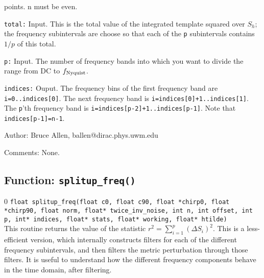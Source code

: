 \begin{description}
  points.  n must be even.
\item{\tt total:} Input.  This is the total value of the integrated
  template squared over $S_h$; the frequency
  subintervals are choose so that each of the {\tt p} subintervals
  contains $1/p$ of this total.
\item{\tt p:} Input.  The number of frequency bands into which you want to divide the range
  from DC to $f_{\rm Nyquist}$.
\item{\tt indices:} Ouput.  The frequency bins of the first frequency band are
  {\tt i=0..indices[0]}.  The next frequency band is  {\tt i=indices[0]+1..indices[1]}.
  The {\tt p}'th frequency band is {\tt i=indices[p-2]+1..indices[p-1]}.
  Note that {\tt indices[p-1]=n-1}.
\end{description}
\begin{description}
\item{Author:}
Bruce Allen, ballen@dirac.phys.uwm.edu
\item{Comments:}
None.
\end{description}
\clearpage

\subsection{Function: {\tt splitup\_freq()}}
\label{ss:splitup_freq}
\setcounter{equation}0
{\tt float splitup\_freq(float c0, float c90, float *chirp0,  float
*chirp90, float norm, float* twice\_inv\_noise, int n, int offset, int
p, int* indices, float* stats, float* working, float* htilde)}\\
This routine returns the value of the statistic $r^2=\sum_{i=1}^p (\Delta S_i)^2$.  This is
a less-efficient version, which internally constructs filters for each of the different frequency
subintervals, and then filters the metric perturbation through those filters.  It is useful
to understand how the different frequency components behave in the time domain, after filtering.

